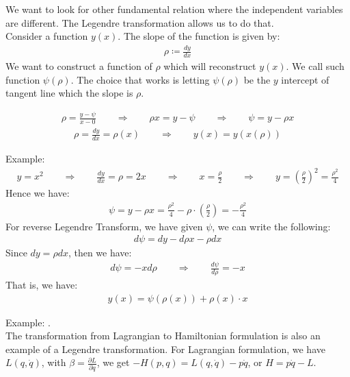 \documentclass[11pt]{article}
\theoremstyle{break}
\theoremstyle{break}
\newcommand{\lr}[1]{\left( #1 \right)}
\newcommand{\example}{\color{green}Example: \color{black}}
\begin{document}
\newpage
We want to look for other fundamental relation where the independent variables are different. The Legendre transformation allows us to do that.\\

Consider a function $y(x)$. The slope of the function is given by:
\begin{align*}
\rho \coloneqq \frac{dy}{dx}
\end{align*}
We want to construct a function of $\rho$ which will reconstruct $y(x)$. We call such function $\psi (\rho)$. The choice that works is letting $\psi(\rho)$ be the $y$ intercept of tangent line which the slope is $\rho$. 

\begin{align*}
\rho = \frac{y - \psi}{x-0} \qquad \Rightarrow \qquad\rho x = y-\psi \qquad \Rightarrow \qquad \psi = y-\rho x 
\end{align*}
\begin{align*}
\rho  = \frac{dy}{dx} = \rho(x) \qquad \Rightarrow \qquad y(x) = y(x(\rho))
\end{align*}

\example
\begin{align*}
y = x^2 \qquad \Rightarrow \qquad \frac{dy}{dx} = \rho = 2x \qquad \Rightarrow \qquad x = \frac{\rho}{2} \qquad \Rightarrow \qquad y = \lr{\frac{\rho}{2}}^2 = \frac{\rho^2}{4}
\end{align*}
Hence we have:
\begin{align*}
\psi = y - \rho x = \frac{\rho^2}{4} - \rho\cdot \lr{\frac{\rho}{2}} = -\frac{\rho^2}{4}
\end{align*}
\hfill\break
\hfill\break
\hfill\break
For reverse Legendre Transform, we have given $\psi$, we can write the following:
\begin{align*}
d\psi = dy - d\rho x - \rho dx
\end{align*}
Since $dy = \rho dx$, then we have:
\begin{align*}
d\psi = -xd\rho \qquad\Rightarrow \qquad \frac{d\psi}{d\rho}= -x
\end{align*}
That is, we have:
\begin{align*}
y(x) =  \psi(\rho(x)) + \rho(x)\cdot x
\end{align*}


\example.\\
The transformation from Lagrangian to Hamiltonian formulation is also an example of a Legendre transformation. For Lagrangian formulation, we have $L(q,\dot{q})$, with $\beta = \frac{\partial L}{\partial \dot{q}}$, we get $-H(p,q) = L(q,\dot{q}) - p \dot{q}$, or $H = p\dot{q}-L$. \\
\end{document}
